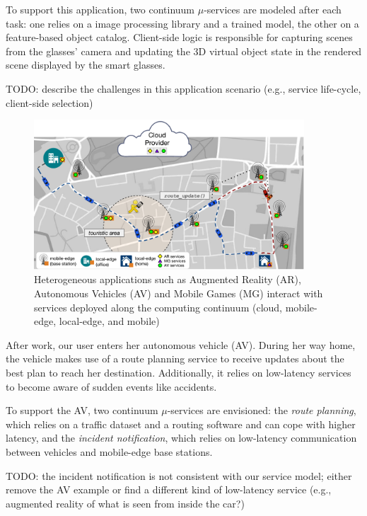 To support this application, two continuum $\mu$-services are modeled after each task: one relies on a image processing library and a trained model, the other on a feature-based object catalog. Client-side logic is responsible for capturing scenes from the glasses' camera and updating the 3D virtual object state in the rendered scene displayed by the smart glasses.

TODO: describe the challenges in this application scenario (e.g., service life-cycle, client-side selection)

\begin{figure}[tbp]
	\includegraphics[width=0.9\textwidth]{figs/Continuum-Scenario}
	\caption{Heterogeneous applications such as Augmented Reality (AR), Autonomous Vehicles (AV) and Mobile Games (MG) interact with services deployed along the computing continuum (cloud, mobile-edge, local-edge, and mobile)}
	\label{fig:continuum-scenario}
\end{figure}

After work, our user enters her autonomous vehicle (AV). During her way home, the vehicle makes use of a route planning service
to receive updates about the best plan to reach her destination. Additionally, it relies on low-latency services to become aware of sudden events like accidents.

To support the AV, two continuum $\mu$-services are envisioned: the \textit{route planning}, which relies on a traffic dataset and a routing software and can cope with higher latency, and the \textit{incident notification}, which relies on low-latency communication between vehicles and mobile-edge base stations.

TODO: the incident notification is not consistent with our service model; either remove the AV example or find a different kind of low-latency service (e.g., augmented reality of what is seen from inside the car?)

